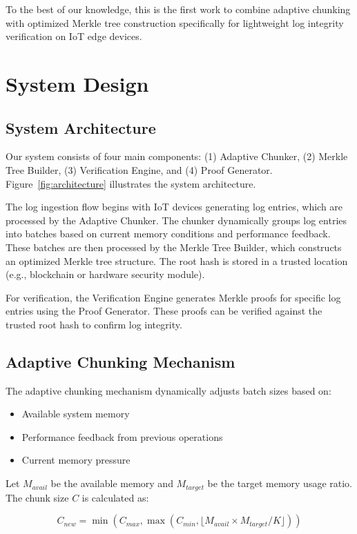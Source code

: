 \documentclass[a4paper,10pt]{article}
\begin{document}
To the best of our knowledge, this is the first work to combine adaptive chunking with optimized Merkle tree construction specifically for lightweight log integrity verification on IoT edge devices.

\section{System Design}
\label{sec:design}

\subsection{System Architecture}

Our system consists of four main components: (1) Adaptive Chunker, (2) Merkle Tree Builder, (3) Verification Engine, and (4) Proof Generator. Figure~\ref{fig:architecture} illustrates the system architecture.

The log ingestion flow begins with IoT devices generating log entries, which are processed by the Adaptive Chunker. The chunker dynamically groups log entries into batches based on current memory conditions and performance feedback. These batches are then processed by the Merkle Tree Builder, which constructs an optimized Merkle tree structure. The root hash is stored in a trusted location (e.g., blockchain or hardware security module).

For verification, the Verification Engine generates Merkle proofs for specific log entries using the Proof Generator. These proofs can be verified against the trusted root hash to confirm log integrity.

\subsection{Adaptive Chunking Mechanism}

The adaptive chunking mechanism dynamically adjusts batch sizes based on:
\begin{itemize}
\item Available system memory
\item Performance feedback from previous operations
\item Current memory pressure
\end{itemize}

Let $M_{avail}$ be the available memory and $M_{target}$ be the target memory usage ratio. The chunk size $C$ is calculated as:

\begin{equation}
C_{new} = \min(C_{max}, \max(C_{min}, \lfloor M_{avail} \times M_{target} / K \rfloor))
\end{equation}
\end{document}
